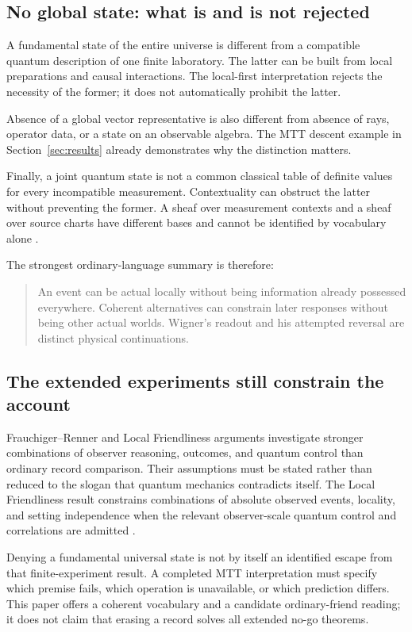 \documentclass[11pt,a4paper]{article}
\begin{document}
\subsection{No global state: what is and is not rejected}
A fundamental state of the entire universe is different from a compatible quantum description of one finite laboratory. The latter can be built from local preparations and causal interactions. The local-first interpretation rejects the necessity of the former; it does not automatically prohibit the latter.

Absence of a global vector representative is also different from absence of rays, operator data, or a state on an observable algebra. The MTT descent example in Section~\ref{sec:results} already demonstrates why the distinction matters.

Finally, a joint quantum state is not a common classical table of definite values for every incompatible measurement. Contextuality can obstruct the latter without preventing the former. A sheaf over measurement contexts and a sheaf over source charts have different bases and cannot be identified by vocabulary alone \cite{AbramskyBrandenburger}.

The strongest ordinary-language summary is therefore:
\begin{quote}
An event can be actual locally without being information already possessed everywhere. Coherent alternatives can constrain later responses without being other actual worlds. Wigner's readout and his attempted reversal are distinct physical continuations.
\end{quote}

\subsection{The extended experiments still constrain the account}
Frauchiger--Renner and Local Friendliness arguments investigate stronger combinations of observer reasoning, outcomes, and quantum control than ordinary record comparison. Their assumptions must be stated rather than reduced to the slogan that quantum mechanics contradicts itself. The Local Friendliness result constrains combinations of absolute observed events, locality, and setting independence when the relevant observer-scale quantum control and correlations are admitted \cite{FrauchigerRenner,Bong}.

Denying a fundamental universal state is not by itself an identified escape from that finite-experiment result. A completed MTT interpretation must specify which premise fails, which operation is unavailable, or which prediction differs. This paper offers a coherent vocabulary and a candidate ordinary-friend reading; it does not claim that erasing a record solves all extended no-go theorems.
\end{document}
